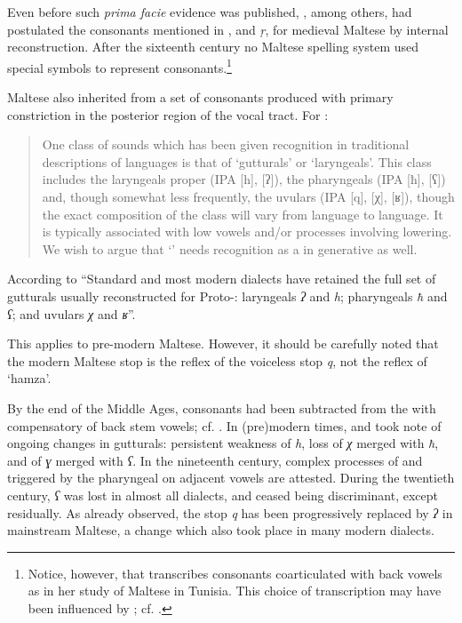 \documentclass[output=paper]{langsci/langscibook}
\begin{document}
Even before such \textit{prima facie} evidence was published, \citet{Cowan1966}, among others, had postulated the  consonants mentioned in , and \textit{ṛ}, for medieval Maltese by internal reconstruction. After the sixteenth century no Maltese spelling system used special symbols to represent  consonants.\footnote{Notice, however, that \citet{Saada1986} transcribes consonants coarticulated with back vowels as  in her study of Maltese in Tunisia. This choice of transcription may have been influenced by  ; cf. \citet{Ghazeli1977}.}

Maltese also inherited from  a set of consonants produced with primary constriction in the posterior region of the vocal tract. For \citet[179]{Hayward1989}:


\begin{quote}
One class of sounds which has been given recognition in traditional descriptions of  languages is that of ‘gutturals’ or ‘laryngeals’. This class includes the laryngeals proper (IPA [h], [ʔ]), the pharyngeals (IPA [ħ], [ʕ]) and, though somewhat less frequently, the uvulars (IPA [q], [χ], [ʁ]), though the exact composition of the class will vary from language to language. It is typically associated with low vowels and/or  processes involving  lowering. We wish to argue that ‘’ needs recognition as a  in generative  as well. 
\end{quote}

According to \citet[191]{McCarthy1994} “Standard  and most modern  dialects have retained the full set of gutturals usually reconstructed for Proto-: laryngeals \textit{ʔ} and \textit{h}; pharyngeals \textit{ħ} and \textit{ʕ}; and uvulars \textit{χ} and \textit{ʁ}”. 


This applies to pre-modern Maltese. However, it should be carefully noted that the modern Maltese  stop is the reflex of the voiceless  stop \textit{q}, not the reflex of  ‘hamza’.

By the end of the Middle Ages,  consonants had been subtracted from the  with compensatory  of back stem vowels; cf. \citet[237]{Comrie1991}. In (pre)modern times, \citet{AgiusdeSoldanis} and \citet{Vassalli1796} took note of ongoing changes in gutturals: persistent weakness of \textit{h}, loss of \textit{χ} merged with \textit{ħ}, and of \textit{ɣ} merged with \textit{ʕ}. In the nineteenth century, complex processes of  and  triggered by the pharyngeal  on adjacent vowels are attested. During the twentieth century, \textit{ʕ} was lost in almost all dialects, and  ceased being discriminant, except residually. As already observed, the  stop \textit{q} has been progressively replaced by  \textit{ʔ} in mainstream Maltese, a change which also took place in many modern  dialects.
\end{document}
